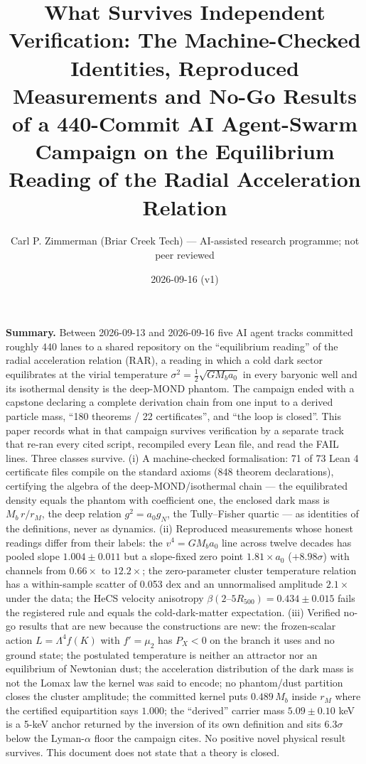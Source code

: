 \documentclass[
  11pt,
]{article}
\title{What Survives Independent Verification: The Machine-Checked
Identities, Reproduced Measurements and No-Go Results of a 440-Commit AI
Agent-Swarm Campaign on the Equilibrium Reading of the Radial
Acceleration Relation}
\author{Carl P. Zimmerman (Briar Creek Tech) --- AI-assisted research
programme; not peer reviewed}
\date{2026-09-16 (v1)}
\begin{document}
\maketitle

\textbf{Summary.} Between 2026-09-13 and 2026-09-16 five AI agent tracks
committed roughly 440 lanes to a shared repository on the ``equilibrium
reading'' of the radial acceleration relation (RAR), a reading in which
a cold dark sector equilibrates at the virial temperature
\(\sigma^2 = \tfrac12\sqrt{G M_b a_0}\) in every baryonic well and its
isothermal density is the deep-MOND phantom. The campaign ended with a
capstone declaring a complete derivation chain from one input to a
derived particle mass, ``180 theorems / 22 certificates'', and ``the
loop is closed''. This paper records what in that campaign survives
verification by a separate track that re-ran every cited script,
recompiled every Lean file, and read the FAIL lines. Three classes
survive. (i) A machine-checked formalisation: 71 of 73 Lean 4
certificate files compile on the standard axioms (848 theorem
declarations), certifying the algebra of the deep-MOND/isothermal chain
--- the equilibrated density equals the phantom with coefficient one,
the enclosed dark mass is \(M_b\,r/r_M\), the deep relation
\(g^2 = a_0 g_N\), the Tully--Fisher quartic --- as identities of the
definitions, never as dynamics. (ii) Reproduced measurements whose
honest readings differ from their labels: the \(v^4 = G M_b a_0\) line
across twelve decades has pooled slope \(1.004 \pm 0.011\) but a
slope-fixed zero point \(1.81\times a_0\) (\(+8.98\sigma\)) with
channels from \(0.66\times\) to \(12.2\times\); the zero-parameter
cluster temperature relation has a within-sample scatter of 0.053 dex
and an unnormalised amplitude \(2.1\times\) under the data; the HeCS
velocity anisotropy \(\beta(2\text{–}5R_{500}) = 0.434 \pm 0.015\) fails
the registered rule and equals the cold-dark-matter expectation. (iii)
Verified no-go results that are new because the constructions are new:
the frozen-scalar action \(L = \Lambda^4 f(K)\) with \(f' = \mu_2\) has
\(P_X < 0\) on the branch it uses and no ground state; the postulated
temperature is neither an attractor nor an equilibrium of Newtonian
dust; the acceleration distribution of the dark mass is not the Lomax
law the kernel was said to encode; no phantom/dust partition closes the
cluster amplitude; the committed kernel puts \(0.489\,M_b\) inside
\(r_M\) where the certified equipartition says \(1.000\); the
``derived'' carrier mass \(5.09 \pm 0.10\) keV is a 5-keV anchor
returned by the inversion of its own definition and sits \(6.3\sigma\)
below the Lyman-\(\alpha\) floor the campaign cites. No positive novel
physical result survives. This document does not state that a theory is
closed.
\end{document}
